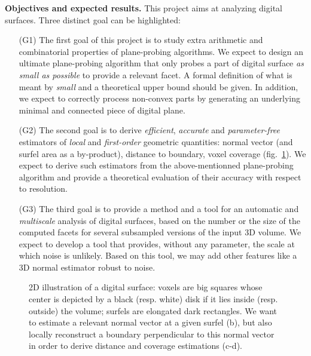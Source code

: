 \noindent\textbf{Objectives and expected results.}
This project aims at analyzing digital surfaces. Three distinct goal can be highlighted:
\begin{enumerate}
  \item[(G1)] 
The first goal of this project is to study extra arithmetic and combinatorial properties
of plane-probing algorithms. We expect to design an ultimate plane-probing algorithm that
only probes a part of digital surface \emph{as small as possible} to provide a relevant facet.
A formal definition of what is meant by \emph{small} and a theoretical upper bound should be given.
In addition, we expect to correctly process non-convex parts by generating an underlying
minimal and connected piece of digital plane. 
 \item[(G2)]
The second goal is to derive \emph{efficient}, \emph{accurate} and \emph{parameter-free} estimators
of \emph{local} and \emph{first-order} geometric quantities: normal vector (and surfel area as a by-product),
distance to boundary, voxel coverage (fig.~\ref{fig:2D}). We expect to derive such estimators from
the above-mentionned plane-probing algorithm and provide a theoretical evaluation of their accuracy
with respect to resolution.  
 \item[(G3)]
The third goal is to provide a method and a tool for an automatic and \emph{multiscale} analysis of digital surfaces,
based on the number or the size of the computed facets for several subsampled versions of the input 3D volume. 
We expect to develop a tool that provides, without any parameter, the scale at which noise is unlikely. Based on
this tool, we may add other features like a 3D normal estimator robust to noise.  
\end{enumerate}

\begin{figure}[hbt]
  \centering
{} \hspace{0.05\textwidth}
 \hspace{0.05\textwidth}
 \hspace{0.05\textwidth}
 \caption{2D illustration of a digital surface: voxels are big squares whose center is depicted by a black (resp. white) disk if it lies inside (resp. outside) the volume; surfels are elongated dark rectangles. We want to estimate a relevant normal vector at a given surfel (b), but also locally reconstruct a boundary perpendicular to this normal vector in order to derive distance and coverage estimations (c-d).} 
\label{fig:2D} 
\end{figure}

